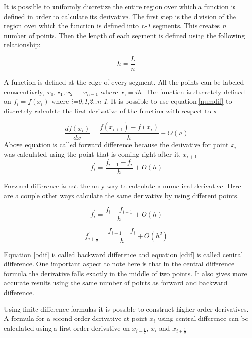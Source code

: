 \begin{doublespace}
It is possible to uniformly discretize the entire region over which a function is defined in order to calculate its derivative. The first step is the division of the region over which the function is defined into \textit{n-1} segments. This creates \textit{n} number of points. Then the length of each segment is defined using the following relationship:

\begin{equation}
h=\frac{L}{n}
\end{equation}

A function is defined at the edge of every segment. All the points can be labeled consecutively, $x_0,x_1,x_2$ ... $x_{n-1}$ where $x_i=ih$. The function is discretely defined on \textit{$f_{i}=f(x_{i})$} where\textit{ i=0,1,2..n-1}. It is possible to use equation  \ref{numdif} to discretely calculate the first derivative of the function with respect to x.

\begin{equation}
\frac{df(x_i)}{dx}=\frac{f(x_{i+1})-f(x_i)}{h} + O(h)
\end{equation}
Above equation is called forward difference because the derivative for point $x_i$ was calculated using the point that is coming right after it, $x_{i+1}$.
\begin{equation}
f^{'}_i=\frac{f_{i+1}-f_i}{h}+ O(h)
\end{equation}

Forward difference is not the only way to calculate a numerical derivative. Here are a couple other ways calculate the same derivative by using different points.

\begin{equation}
f^{'}_i=\frac{f_{i}-f_{i-1}}{h}+ O(h)
\label{bdif}
\end{equation}

\begin{equation}
f^{'}_{i+\frac{1}{2}}=\frac{f_{i+1}-f_i}{h}+ O(h^2)
\label{cdif}
\end{equation}

Equation \ref{bdif} is called backward difference and equation \ref{cdif} is called central difference. One important aspect to note here is that in the central difference formula the derivative falls exactly in the middle of two points. It also gives more accurate results using the same number of points as forward and backward difference. 

Using finite difference formulas it is possible to construct higher order derivatives. A formula for a second order derivative at point $x_i$ using central difference can be calculated using a first order derivative on $x_{i-\frac{1}{2}}$, $x_i$ and $x_{i+\frac{1}{2}}$  


\end{doublespace}
